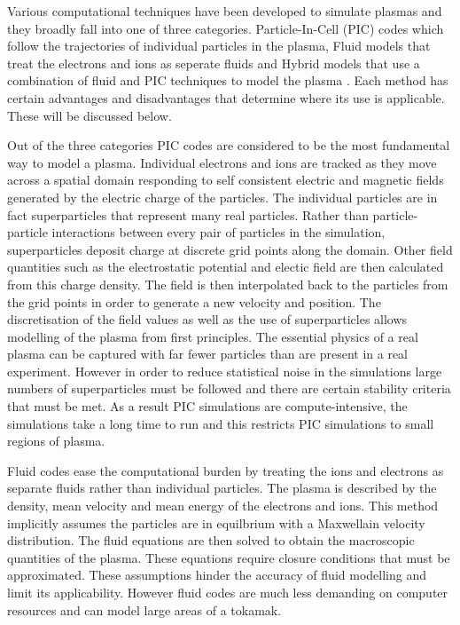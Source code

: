  
Various computational techniques have been developed to simulate plasmas and they broadly fall into one of three categories. Particle-In-Cell (PIC) codes which follow the trajectories of individual particles in the plasma, Fluid models that treat the electrons and ions as seperate fluids and Hybrid models that use a combination of fluid and PIC techniques to model the plasma \cite{simulation_techniques}. Each method has certain advantages and disadvantages that determine where its use is applicable. These will be discussed below.

Out of the three categories PIC codes are considered to be the most fundamental way to model a plasma. Individual electrons and ions are tracked as they move across a spatial domain responding to self consistent electric and magnetic fields generated by the electric charge of the particles. The individual particles are in fact superparticles that represent many real particles.  Rather than particle-particle interactions between every pair of particles in the simulation, superparticles deposit charge at discrete grid points along the domain. Other field quantities such as the electrostatic potential and electic field are then calculated from this charge density. The field is then interpolated back to the particles from the grid points in order to generate a new velocity and position. The discretisation of the field values as well as the use of superparticles allows modelling of the plasma from first principles. The essential physics of a real plasma can be captured with far fewer particles than are present in a real experiment. However in order to reduce statistical noise in the simulations large numbers of superparticles must be followed and there are certain stability criteria that must be met. As a result PIC simulations are compute-intensive, the simulations take a long time to run and this restricts PIC simulations to small regions of plasma.

Fluid codes ease the computational burden by treating the ions and electrons as separate fluids rather than individual particles. The plasma is described by the density, mean velocity and mean energy of the electrons and ions. This method implicitly assumes the particles are in equilbrium with a Maxwellain velocity distribution. The fluid equations are then solved to obtain the macroscopic quantities of the plasma. These equations require closure conditions that must be approximated. These assumptions hinder the accuracy of fluid modelling and limit its applicability. However fluid codes are much less demanding on computer resources and can model large areas of a tokamak.

